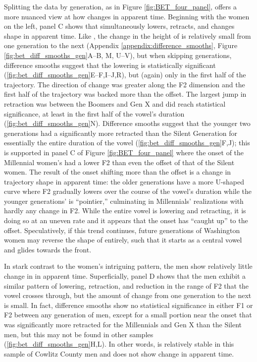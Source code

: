 Splitting the data by generation, as in Figure \ref{fig:BET_four_panel}, offers a more nuanced view at how \bet changes in apparent time. Beginning with the women on the left, panel C shows that \bet simultaneously lowers, retracts, and changes shape in apparent time. Like \bat, the change in the height of \bet is relatively small from one generation to the next (Appendix \ref{appendix:difference_smooths}, Figure \ref{fig:bet_diff_smooths_gen}A--B, M, U--V), but when skipping generations, difference smooths suggest that the lowering is statistically significant (\ref{fig:bet_diff_smooths_gen}E--F,I--J,R), but (again) only in the first half of the trajectory. The direction of change was greater along the F2 dimension and the first half of the trajectory was backed more than the offset. The largest jump in \bet retraction was between the Boomers and Gen X and did reach statistical significance, at least in the first half of the vowel's duration (\ref{fig:bet_diff_smooths_gen}N). Difference smooths suggest that the younger two generations had a significantly more retracted \bet than the Silent Generation for essentially the entire duration of the vowel (\ref{fig:bet_diff_smooths_gen}F,J); this is supported in panel C of Figure \ref{fig:BET_four_panel} where the onset of the Millennial women's \bet had a lower F2 than even the offset of that of the Silent women. The result of the onset shifting more than the offset is a change in trajectory shape in apparent time: the older generations have a more U-shaped curve where F2 gradually lowers over the course of the vowel's duration while the younger generations' \bet is ``pointier,'' culminating in Millennials' realizations with hardly any change in F2. While the entire vowel is lowering and retracting, it is doing so at an uneven rate and it appears that the onset has ``caught up'' to the offset. Speculatively, if this trend continues, future generations of Washington women may reverse the shape of \bet entirely, such that it starts as a central vowel and glides towards the front.

In stark contrast to the women's intriguing pattern, the men show relatively little change in \bet in apparent time. Superficially, panel D shows that the men exhibit a similar pattern of lowering, retraction, and reduction in the range of F2 that the vowel crosses through, but the amount of change from one generation to the next is small. In fact, difference smooths show no statistical significance in either F1 or F2 between any generation of men, except for a small portion near the onset that was significantly more retracted for the Millennials and Gen X than the Silent men, but this may not be found in other samples (\ref{fig:bet_diff_smooths_gen}H,L). In other words, \bet is relatively stable in this sample of Cowlitz County men and does not show change in apparent time.

